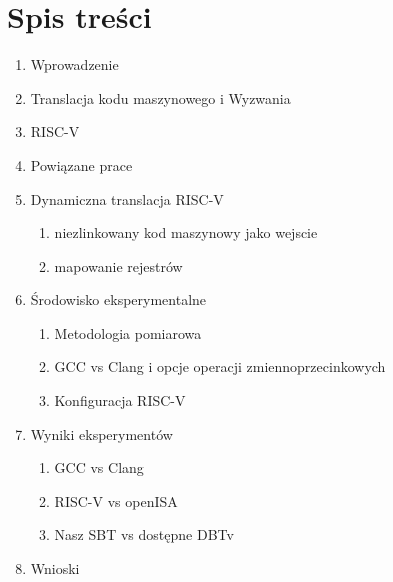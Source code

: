 \documentclass[11pt]{article}
\begin{document}
\section{Spis treści}
\label{sec:org98042da}
\begin{enumerate}
\item Wprowadzenie
\item Translacja kodu maszynowego i Wyzwania
\item RISC-V
\item Powiązane prace
\item Dynamiczna translacja RISC-V
\begin{enumerate}
\item niezlinkowany kod maszynowy jako wejscie
\item mapowanie rejestrów
\end{enumerate}
\item Środowisko eksperymentalne
\begin{enumerate}
\item Metodologia pomiarowa
\item GCC vs Clang i opcje operacji zmiennoprzecinkowych
\item Konfiguracja RISC-V
\end{enumerate}
\item Wyniki eksperymentów
\begin{enumerate}
\item GCC vs Clang
\item RISC-V vs openISA
\item Nasz SBT vs dostępne DBTv
\end{enumerate}
\item Wnioski
\end{enumerate}
\end{document}
